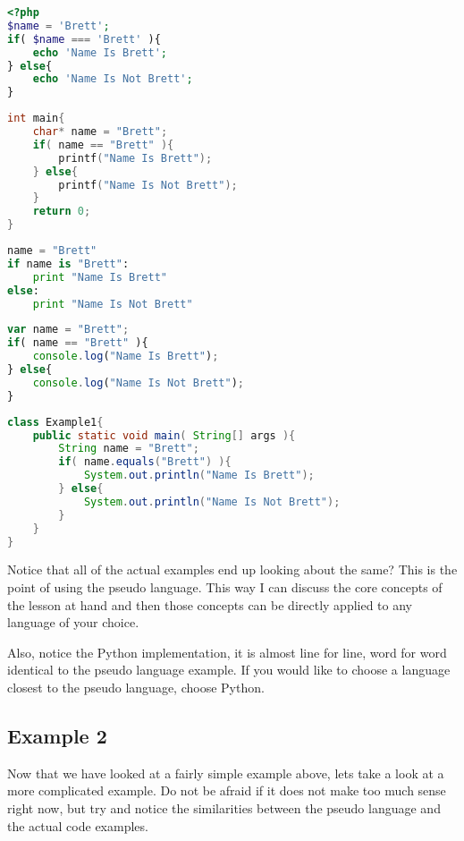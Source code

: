\begin{lstlisting}[language=php,caption={Example 1 - PHP}]
<?php
$name = 'Brett';
if( $name === 'Brett' ){
    echo 'Name Is Brett';
} else{
    echo 'Name Is Not Brett';
}
\end{lstlisting}

\begin{lstlisting}[language=c,caption={Example 1 - C}]
int main{
    char* name = "Brett";
    if( name == "Brett" ){
        printf("Name Is Brett");
    } else{
        printf("Name Is Not Brett");
    }
    return 0;
}
\end{lstlisting}

\begin{lstlisting}[language=python,caption={Example 1 - Python}]
name = "Brett"
if name is "Brett":
    print "Name Is Brett"
else:
    print "Name Is Not Brett"
\end{lstlisting}

\begin{lstlisting}[language=javascript,caption={Example 1 - Node.JS}]
var name = "Brett";
if( name == "Brett" ){
    console.log("Name Is Brett");
} else{
    console.log("Name Is Not Brett");
}
\end{lstlisting}

\begin{lstlisting}[language=java,caption={Example 1 - Java}]
class Example1{
    public static void main( String[] args ){
        String name = "Brett";
        if( name.equals("Brett") ){
            System.out.println("Name Is Brett");
        } else{
            System.out.println("Name Is Not Brett");
        }
    }
}
\end{lstlisting}

Notice that all of the actual examples end up looking about the same? This is the point of using the pseudo language. This way I can discuss the core concepts of the lesson at hand and then those concepts can be directly applied to any language of your choice.
\par

Also, notice the Python implementation, it is almost line for line, word for word identical to the pseudo language example. If you would like to choose a language closest to the pseudo language, choose Python.

\subsection{Example 2}
Now that we have looked at a fairly simple example above, lets take a look at a more complicated example.
Do not be afraid if it does not make too much sense right now, but try and notice the similarities
between the pseudo language and the actual code examples.



